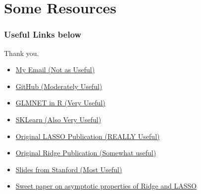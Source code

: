 \documentclass[]{beamer}
\begin{document}
\section{Some Resources}
\begin{frame}
\frametitle{Useful Links below}
Thank you.
\begin{itemize}
\item<1-> \href{mailto:fja2114@columbia.edu}{My Email (Not as Useful)}
\item<2-> \href{https://github.com/franciscojavierarceo/Amazon/blob/master/RegularizedRegressionExample.R}{GitHub (Moderately Useful)}
\item<3-> \href{http://cran.r-project.org/web/packages/glmnet/glmnet.pdf}{GLMNET in R (Very Useful)}
\item<4-> \href{http://scikit-learn.org/0.10/auto_examples/linear_model/lasso_and_elasticnet.html}{SKLearn (Also Very Useful)}
\item<5-> \href{http://statweb.stanford.edu/~tibs/lasso/lasso.pdf}{Original LASSO Publication (REALLY Useful)}
\item<6-> \href{http://math.arizona.edu/~hzhang/math574m/Read/Ridge.pdf}{Original Ridge Publication (Somewhat useful)}
\item<7-> \href{http://statweb.stanford.edu/~owen/courses/305/Rudyregularization.pdf}{Slides from Stanford (Most Useful)}
\item<8-> \href{http://arxiv.org/pdf/1306.5505v3.pdf}{Sweet paper on asymptotic properties of Ridge and LASSO}
\end{itemize}
\end{frame}
\end{document}
